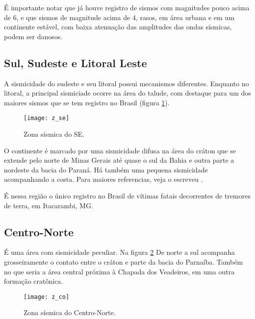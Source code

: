 É importante notar que já houve registro de sismos com magnitudes pouco acima de 6,
e que sismos de magnitude acima de 4, rasos, em área urbana e em um continente estável,
com baixa atenuação das amplitudes das ondas sísmicas, podem ser danosos.


\subsection{Sul, Sudeste e Litoral Leste}
\label{sec:z_se}

A sismicidade do sudeste e seu litoral possui mecanismos diferentes.
Enquanto no litoral, a principal sismiciade ocorre na área do talude, com
destaque para um dos maiores sismos que se tem registro no Brasil (figura \ref{fig:z_se}).

\begin{figure}[H]
  \centering
  \texttt{[image: z\_se]} 
  \caption{Zona sísmica do SE. \citet{dourado_2014}}
  \label{fig:z_se} 
\end{figure}

O continente é marcado por uma sismicidade difusa na área do cráton que se extende pelo norte de Minas
Gerais até quase o sul da Bahia e outra parte a nordeste da bacia do Paraná. 
Há também uma pequena sismicidade acompanhando a costa. Para maiores referencias, veja o escreveu
\citet{assumpcao_2004}.

É nessa região o único registro no Brasil de vítimas fatais decorrentes de tremores de terra, em Itacarambi, MG.

\subsection{Centro-Norte}
\label{sec:z_cn}

É uma área com sismicidade peculiar. Na figura \ref{fig:z_cn} De norte a sul acompanha grosseiramente o
contato entre o cráton e parte da bacia do Parnaíba. Também no que seria a 
área central próxima à Chapada dos Veadeiros, em uma outra formação cratônica.

\begin{figure}[H]
  \centering
  \texttt{[image: z\_co]} 
  \caption{Zona sísmica do Centro-Norte. \citet{dourado_2014}}
  \label{fig:z_cn} 
\end{figure}

